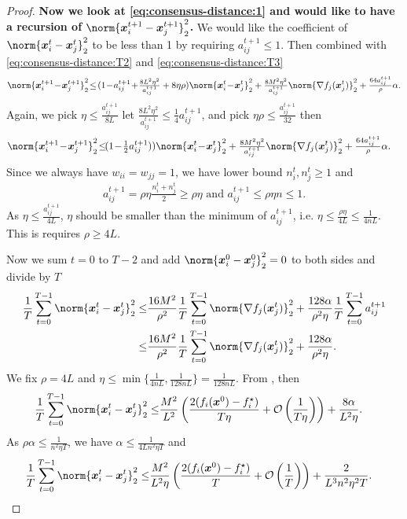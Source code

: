 \documentclass{article}
\begin{document}
\begin{proof}
  \textbf{Now we look at \eqref{eq:consensus-distance:1} and would like to have a recursion of $\norm{\xx_i^{t+1} - \xx_j^{t+1}}_2^2$.} We would like the coefficient of $\norm{\xx_i^t-\xx_j^t}_2^2$ to be less than 1 by requiring $a_{ij}^{t+1}\le1$.
  Then combined with \eqref{eq:consensus-distance:T2} and \eqref{eq:consensus-distance:T3}
  \begin{equation*}
      \norm{\xx_i^{t+1} \!-\! \xx_j^{t+1}}_2^2
      \!\le\!(1\!-\!a_{ij}^{t+1} \!+\! \tfrac{8L^2\eta^2}{a_{ij}^{t+1}} + 8\eta\rho ) \norm{\xx_i^t\!-\!\xx_j^t}_2^2 + \tfrac{8M^2\eta^2}{a_{ij}^{t+1}} \norm{\nabla f_j(\xx_j^t)}_2^2 + \tfrac{64a_{ij}^{t+1}}{\rho} \alpha.
  \end{equation*}
  Again, we pick $\eta\le\frac{a_{ij}^{t+1}}{8L}$ let $\frac{8L^2\eta^2}{a_{ij}^{t+1}}\le\frac{1}{4}a_{ij}^{t+1}$, and pick $\eta\rho\le \frac{a_{ij}^{t+1}}{32}$ then
  \begin{align*}
    \norm{\xx_i^{t+1} \!-\! \xx_j^{t+1}}_2^2
    \!\le&\!(1\!-\!\tfrac{1}{2}a_{ij}^{t+1}) ) \norm{\xx_i^t\!-\!\xx_j^t}_2^2 + \tfrac{8M^2\eta^2}{a_{ij}^{t+1}} \norm{\nabla f_j(\xx_j^t)}_2^2 + \tfrac{64a_{ij}^{t+1}}{\rho} \alpha.
  \end{align*}
  Since we always have $w_{ii}=w_{jj}=1$, we have lower bound $n_i^t,n_j^t\ge1$ and
  \begin{equation}
    a_{ij}^{t+1} = \rho\eta \tfrac{n_i^t+n_j^t}{2} \ge \rho\eta \text{ and }
    a_{ij}^{t+1} \le \rho\eta n \le 1.
  \end{equation}
  As $\eta\le\frac{a_{ij}^{t+1}}{4L}$, $\eta$ should be smaller than the minimum of $a_{ij}^{t+1}$, i.e. $\eta\le\frac{\rho\eta}{4L}\le\frac{1}{4nL}$. This is requires $\rho\ge 4L$.

  Now we sum $t=0$ to $T-2$ and add $\norm{\xx_i^0-\xx_j^0}_2^2=0$ to both sides and divide by $T$
  \begin{align*}
    \frac{1}{T} \sum_{t=0}^{T-1} \norm{\xx_i^{t} - \xx_j^{t}}_2^2
    \le& \frac{16M^2}{\rho^2} \frac{1}{T} \sum_{t=0}^{T-1} \norm{\nabla f_j(\xx_j^t)}_2^2 
    +\frac{128\alpha}{\rho^2\eta} \frac{1}{T} \sum_{t=0}^{T-1}a_{ij}^{t+1} \\
    \le& \frac{16M^2}{\rho^2} \frac{1}{T} \sum_{t=0}^{T-1} \norm{\nabla f_j(\xx_j^t)}_2^2 
    +\frac{128\alpha}{\rho^2\eta}.
  \end{align*}
  We fix $\rho=4L$ and $\eta\le\min\{ \frac{1}{4nL}, \frac{1}{128nL} \}=\frac{1}{128nL}$.
  From , then 
  \begin{align*}
    \frac{1}{T} \sum_{t=0}^{T-1} \norm{\xx_i^{t} - \xx_j^{t}}_2^2
    \le& \frac{M^2}{L^2} \left(\frac{2(f_i(\xx^{0}) - f_i^\star)}{T\eta} + \cO\left(\frac{1}{T\eta}\right) \right)
    + \frac{8\alpha}{L^2\eta}.
  \end{align*}
  As $\rho\alpha\le\frac{1}{n^2 \eta T}$, we have $\alpha\le\frac{1}{4Ln^2\eta T}$ and
  \begin{align*}
    \frac{1}{T} \sum_{t=0}^{T-1} \norm{\xx_i^{t} - \xx_j^{t}}_2^2
    \le& \frac{M^2}{L^2\eta}\left( \frac{2(f_i(\xx^{0}) - f_i^\star)}{T} + \cO\left(\frac{1}{T}\right) \right)
    + \frac{2}{L^3n^2\eta^2 T}.
  \end{align*}
\end{proof}
\end{document}
